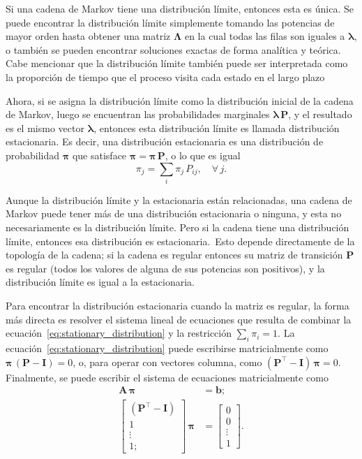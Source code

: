 Si una cadena de Markov tiene una distribución límite, entonces esta es única.
Se puede encontrar la distribución límite simplemente tomando las potencias de mayor orden hasta obtener una matriz $\boldsymbol{\Lambda}$ en la cual todas las filas son iguales a $\boldsymbol{\lambda}$, o también se pueden encontrar soluciones exactas de forma analítica y teórica.
Cabe mencionar que la distribución límite también puede ser interpretada como la proporción de tiempo que el proceso visita cada estado en el largo plazo

Ahora, si se asigna la distribución límite como la distribución inicial de la cadena de Markov, luego se encuentran las probabilidades marginales $\boldsymbol{\lambda}\,\mathbf{P}$, y el resultado es el mismo vector $\boldsymbol{\lambda}$, entonces esta distribución límite es llamada distribución estacionaria.
Es decir, una distribución estacionaria es una distribución de probabilidad $\boldsymbol{\pi}$ que satisface $\boldsymbol{\pi} = \boldsymbol{\pi}\,\mathbf{P}$, o lo que es igual
%
\begin{equation}
    \label{eq:stationary_distribution}
    \pi_j = \sum_i \pi_j\, P_{ij}, \quad \forall\, j.
\end{equation}

Aunque la distribución límite y la estacionaria están relacionadas, una cadena de Markov puede tener más de una distribución estacionaria o ninguna, y esta no necesariamente es la distribución límite.
Pero si la cadena tiene una distribución límite, entonces esa distribución es estacionaria.\ Esto depende directamente de la topología de la cadena;
si la cadena es regular entonces su matriz de transición $\mathbf{P}$ es regular (todos los valores de alguna de sus potencias son positivos), y la distribución límite es igual a la estacionaria.

Para encontrar la distribución estacionaria cuando la matriz es regular, la forma más directa es resolver el sistema lineal de ecuaciones que resulta de combinar la ecuación~\eqref{eq:stationary_distribution} y la restricción $\sum_i \pi_i = 1$.
La ecuación~\eqref{eq:stationary_distribution} puede escribirse matricialmente como $\boldsymbol{\pi}\,(\mathbf{P} - \mathbf{I}) = 0$, o, para operar con vectores columna, como $\left(\mathbf{P}^\intercal - \mathbf{I}\right)\,\boldsymbol{\pi} = 0$.
Finalmente, se puede escribir el sistema de ecuaciones matricialmente como
%
\begin{align}
    \mathbf{A}\,\boldsymbol{\pi} &= \mathbf{b}; \\
    \left[\begin{matrix}
              \left(\mathbf{P}^\intercal - \mathbf{I}\right) \\ 1 \\ \vdots \\ 1;
    \end{matrix}\right]\,\boldsymbol{\pi} &= \left[\begin{matrix}
                                                       0 \\ 0 \\ \vdots \\ 1
    \end{matrix}\right].
\end{align}

